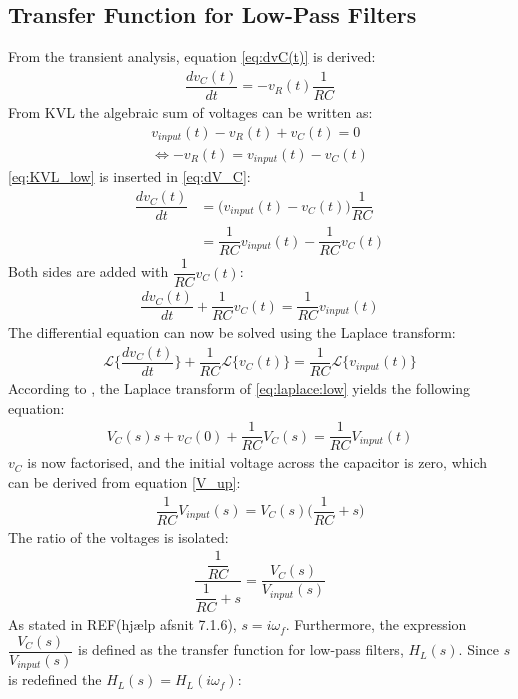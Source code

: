 \subsection{Transfer Function for Low-Pass Filters}
From the transient analysis, equation \eqref{eq:dvC(t)} is derived:
\begin{align} \label{eq:dV_C}
\dfrac{dv_C(t)}{dt}=-v_R(t)\dfrac{1}{RC}
\end{align}
From KVL the algebraic sum of voltages can be written as: 
\begin{align}
v_{input}(t)-v_{R}(t)+v_{C}(t)=0
\\
\Leftrightarrow -v_{R}(t) = v_{input}(t) - v_{C}(t) \label{eq:KVL_low}
\end{align}
\eqref{eq:KVL_low} is inserted in \eqref{eq:dV_C}:
\begin{align} 
\dfrac{dv_C(t)}{dt}&=\Big(v_{input}(t) - v_{C}(t)\Big)\dfrac{1}{RC}
\\
&=\dfrac{1}{RC}v_{input}(t) - \dfrac{1}{RC}v_{C}(t)
\end{align}
Both sides are added with $\dfrac{1}{RC}v_C(t)$:
\begin{align}
\dfrac{dv_C(t)}{dt}+\dfrac{1}{RC}v_C(t)=\dfrac{1}{RC}v_{input}(t)
\end{align}
The differential equation can now be solved using the Laplace transform:
\begin{align}\label{eq:laplace:low}\mathcal{L}\bigg\{\dfrac{dv_C(t)}{dt}\bigg\}+\dfrac{1}{RC}\mathcal{L}\Big\{v_C(t)\Big\}=\dfrac{1}{RC}\mathcal{L}\Big\{v_{input}(t)\Big\}
\end{align}
According to , the Laplace transform of \eqref{eq:laplace:low} yields the following equation:
\begin{align}
V_C(s)s+v_C(0)+\dfrac{1}{RC}V_C(s)=\dfrac{1}{RC}V_{input}(t)
\end{align} 
$v_{C}$ is now factorised, and the initial voltage across the capacitor is zero, which can be derived from equation \eqref{V_up}:
\begin{align}
\dfrac{1}{RC}V_{input}(s)=V_{C}(s)\Big(\dfrac{1}{RC}+s\Big)
\end{align} 
The ratio of the voltages is isolated:
\begin{align}
\dfrac{\dfrac{1}{RC}}{\dfrac{1}{RC}+s} = \dfrac{V_{C}(s)}{V_{input}(s)}
\end{align} 
As stated in REF(hjælp afsnit 7.1.6), $s=i \omega_f$. Furthermore, the expression $\dfrac{V_{C}(s)}{V_{input}(s)}$ is defined as the transfer function for low-pass filters, $H_{L}(s)$. Since $s$ is redefined the $H_{L}(s)=H_{L}(i \omega_f)$:
